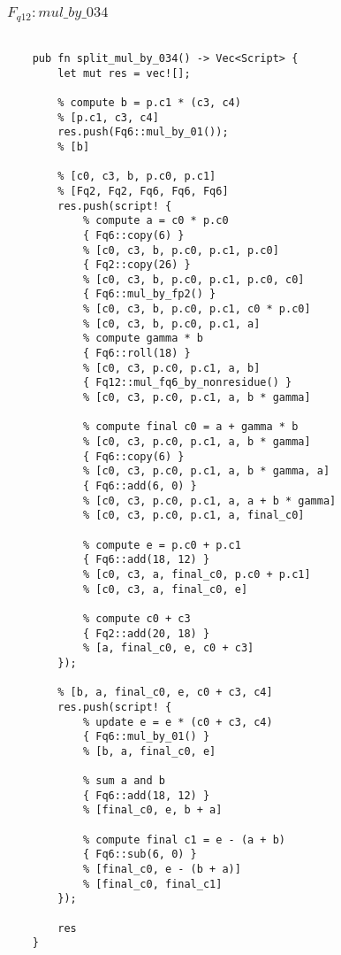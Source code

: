 \subsubsection{$F_{q12}: mul\_by\_034$}

\begin{lstlisting}

    pub fn split_mul_by_034() -> Vec<Script> {
        let mut res = vec![];

        % compute b = p.c1 * (c3, c4)
        % [p.c1, c3, c4]
        res.push(Fq6::mul_by_01());
        % [b]

        % [c0, c3, b, p.c0, p.c1]
        % [Fq2, Fq2, Fq6, Fq6, Fq6]
        res.push(script! {
            % compute a = c0 * p.c0
            { Fq6::copy(6) }
            % [c0, c3, b, p.c0, p.c1, p.c0]
            { Fq2::copy(26) }
            % [c0, c3, b, p.c0, p.c1, p.c0, c0]
            { Fq6::mul_by_fp2() }
            % [c0, c3, b, p.c0, p.c1, c0 * p.c0]
            % [c0, c3, b, p.c0, p.c1, a]
            % compute gamma * b
            { Fq6::roll(18) }
            % [c0, c3, p.c0, p.c1, a, b]
            { Fq12::mul_fq6_by_nonresidue() }
            % [c0, c3, p.c0, p.c1, a, b * gamma]

            % compute final c0 = a + gamma * b
            % [c0, c3, p.c0, p.c1, a, b * gamma]
            { Fq6::copy(6) }
            % [c0, c3, p.c0, p.c1, a, b * gamma, a]
            { Fq6::add(6, 0) }
            % [c0, c3, p.c0, p.c1, a, a + b * gamma]
            % [c0, c3, p.c0, p.c1, a, final_c0]

            % compute e = p.c0 + p.c1
            { Fq6::add(18, 12) }
            % [c0, c3, a, final_c0, p.c0 + p.c1]
            % [c0, c3, a, final_c0, e]

            % compute c0 + c3
            { Fq2::add(20, 18) }
            % [a, final_c0, e, c0 + c3]
        });

        % [b, a, final_c0, e, c0 + c3, c4]
        res.push(script! {
            % update e = e * (c0 + c3, c4)
            { Fq6::mul_by_01() }
            % [b, a, final_c0, e]

            % sum a and b
            { Fq6::add(18, 12) }
            % [final_c0, e, b + a]

            % compute final c1 = e - (a + b)
            { Fq6::sub(6, 0) }
            % [final_c0, e - (b + a)]
            % [final_c0, final_c1]
        });

        res
    }
    
\end{lstlisting}


